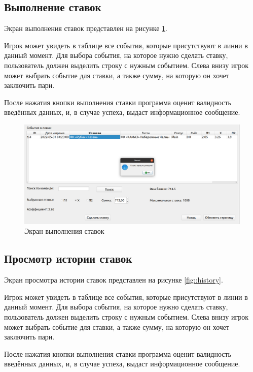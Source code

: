 \subsection{Выполнение ставок}
Экран выполнения ставок представлен на рисунке \ref{fig::bet}.

Игрок может увидеть в таблице все события, которые присутствуют в линии в данный момент.
Для выбора события, на которое нужно сделать ставку, пользователь должен выделить строку с нужным событием.
Слева внизу игрок может выбрать событие для ставки, а также сумму, на которую он хочет заключить пари.

После нажатия кнопки выполнения ставки программа оценит валидность введённых данных, и, в случае успеха, выдаст информационное сообщение.

\FloatBarrier
\begin{figure}[hp]	
	\begin{center}
		\includegraphics[width=\linewidth]{inc/bet.png}
	\end{center}
	\caption{Экран выполнения ставок}
	\label{fig::bet}
\end{figure}
\FloatBarrier

\subsection{Просмотр истории ставок}
Экран просмотра истории ставок представлен на рисунке \ref{fig::history}.

Игрок может увидеть в таблице все события, которые присутствуют в линии в данный момент.
Для выбора события, на которое нужно сделать ставку, пользователь должен выделить строку с нужным событием.
Слева внизу игрок может выбрать событие для ставки, а также сумму, на которую он хочет заключить пари.

После нажатия кнопки выполнения ставки программа оценит валидность введённых данных, и, в случае успеха, выдаст информационное сообщение.

